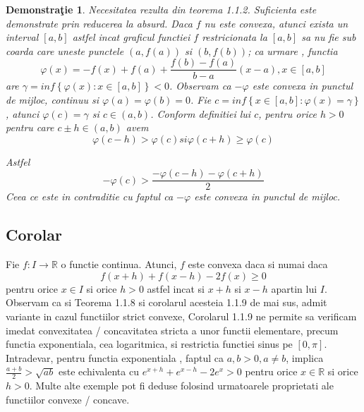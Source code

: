 \documentclass[a4paper,12pt,oneside]{report}
\newtheorem{demonstration}{Demonstra\c tie}
\begin{document}
\begin{demonstration}
Necesitatea rezulta din teorema 1.1.2. Suficienta este demonstrate prin reducerea la absurd. Daca \(f\) nu este convexa, atunci exista un interval \(\left [ a,b \right ]\) astfel incat graficul functiei \(f\) restricionata la  \(\left [ a,b \right ]\) sa nu fie sub coarda care uneste punctele \(\left ( a, f\left ( a \right ) \right )\) si \(\left ( b, f\left ( b \right ) \right )\); ca urmare , functia
\begin{displaymath}
  \varphi \left ( x \right )= -f\left ( x \right ) + f\left ( a \right )+ \frac{f\left ( b \right )- f\left ( a \right )}{b-a}\left ( x-a \right ), x\in \left [ a,b \right ]
\end{displaymath}
are  \(\gamma = inf \left \{ \varphi \left ( x \right ) : x\in \left [ a,b \right ]\right \}< 0\). Observam ca \(-\varphi\) este convexa in punctul de mijloc, continuu si \(\varphi \left ( a \right ) =\varphi \left ( b \right ) = 0\). Fie \(c = inf \left \{ x \in \left [ a,b  \right ] : \varphi \left ( x \right )= \gamma \right \} \), atunci \(\varphi \left ( c \right ) = \gamma\)  si \(c \in \left ( a,b  \right )\). Conform definitiei lui \(c\), pentru orice \(h>0\) pentru care \(c\pm h\in \left ( a,b \right )\) avem 
\begin{displaymath}
  \varphi \left ( c - h  \right )> \varphi \left ( c \right ) si \varphi \left ( c + h  \right )\geq  \varphi \left ( c \right )
\end{displaymath}

Astfel 
\begin{displaymath}
  -\varphi \left ( c \right )> \frac{-\varphi \left ( c-h \right )-\varphi \left ( c+h \right )}{2} 
\end{displaymath}
Ceea ce este in contraditie cu faptul ca \(-\varphi\) este convexa in punctul de mijloc. 
\end{demonstration}


\subsection{Corolar}

Fie \(f: I \rightarrow \mathbb{R}\) o functie continua. Atunci, \(f\) este convexa daca si numai daca
\begin{displaymath}
  f\left ( x+h \right )+ f\left ( x - h \right ) - 2f\left ( x \right )\geq 0
\end{displaymath}
pentru orice \(x \in I\) si orice \(h > 0\) astfel incat si \(x + h\) si \(x - h\) apartin lui \(I\). 
Observam ca si Teorema 1.1.8 si corolarul acesteia 1.1.9 de mai sus, admit variante in cazul functiilor strict convexe, 
Corolarul 1.1.9 ne permite sa verificam imedat convexitatea / concavitatea stricta a unor functii elementare, precum functia exponentiala, cea logaritmica, si restrictia functiei sinus pe \(\left [ 0 , \pi \right ]\). Intradevar, pentru functia exponentiala , faptul ca  \(a , b > 0, a\neq b\), implica \(\frac{a + b}{2}> \sqrt{ab}\)
este echivalenta cu 
\(e^{x + h} + e^{x - h } - 2e^{x}> 0\)
pentru orice \(x\in \mathbb{R}\) si orice \(h > 0\).
	Multe alte exemple pot fi deduse folosind urmatoarele proprietati ale functiilor convexe / concave. 
\end{document}
